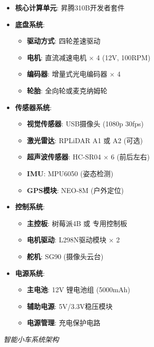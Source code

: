 \begin{itemize}
\tightlist
\item
  \textbf{核心计算单元}: 昇腾310B开发者套件
\item
  \textbf{底盘系统}:

  \begin{itemize}
  \tightlist
  \item
    \textbf{驱动方式}: 四轮差速驱动
  \item
    \textbf{电机}: 直流减速电机 × 4 (12V, 100RPM)
  \item
    \textbf{编码器}: 增量式光电编码器 × 4
  \item
    \textbf{轮胎}: 全向轮或麦克纳姆轮
  \end{itemize}
\item
  \textbf{传感器系统}:

  \begin{itemize}
  \tightlist
  \item
    \textbf{视觉传感器}: USB摄像头 (1080p 30fps)
  \item
    \textbf{激光雷达}: RPLiDAR A1 或 A2 (可选)
  \item
    \textbf{超声波传感器}: HC-SR04 × 6 (前后左右)
  \item
    \textbf{IMU}: MPU6050 (姿态检测)
  \item
    \textbf{GPS模块}: NEO-8M (户外定位)
  \end{itemize}
\item
  \textbf{控制系统}:

  \begin{itemize}
  \tightlist
  \item
    \textbf{主控板}: 树莓派4B 或 专用控制板
  \item
    \textbf{电机驱动}: L298N驱动模块 × 2
  \item
    \textbf{舵机}: SG90 (摄像头云台)
  \end{itemize}
\item
  \textbf{电源系统}:

  \begin{itemize}
  \tightlist
  \item
    \textbf{主电池}: 12V 锂电池组 (5000mAh)
  \item
    \textbf{辅助电源}: 5V/3.3V稳压模块
  \item
    \textbf{电源管理}: 充电保护电路
  \end{itemize}
\end{itemize}

\emph{智能小车系统架构}

